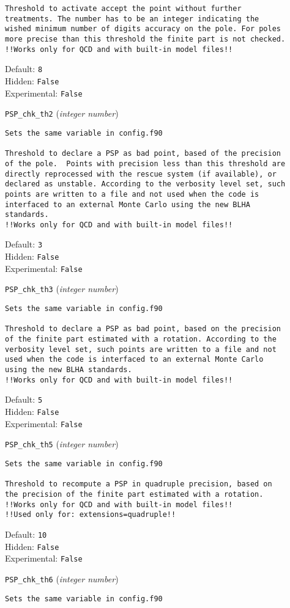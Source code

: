 \begin{basedescript}{\desclabelstyle{\pushlabel}}
\begin{verbatim}
Threshold to activate accept the point without further
treatments. The number has to be an integer indicating the
wished minimum number of digits accuracy on the pole. For poles
more precise than this threshold the finite part is not checked.
!!Works only for QCD and with built-in model files!!
\end{verbatim}
Default: \verb|8|
\\Hidden: \verb|False|
\\Experimental: \verb|False|
\\\item[\colorbox{gray!30}{\texttt{PSP\_chk\_th2}}] (\textit{integer number})
\begin{verbatim}
Sets the same variable in config.f90

Threshold to declare a PSP as bad point, based of the precision
of the pole.  Points with precision less than this threshold are
directly reprocessed with the rescue system (if available), or
declared as unstable. According to the verbosity level set, such
points are written to a file and not used when the code is
interfaced to an external Monte Carlo using the new BLHA
standards.
!!Works only for QCD and with built-in model files!!
\end{verbatim}
Default: \verb|3|
\\Hidden: \verb|False|
\\Experimental: \verb|False|
\\\item[\colorbox{gray!30}{\texttt{PSP\_chk\_th3}}] (\textit{integer number})
\begin{verbatim}
Sets the same variable in config.f90

Threshold to declare a PSP as bad point, based on the precision
of the finite part estimated with a rotation. According to the
verbosity level set, such points are written to a file and not
used when the code is interfaced to an external Monte Carlo
using the new BLHA standards.
!!Works only for QCD and with built-in model files!!
\end{verbatim}
Default: \verb|5|
\\Hidden: \verb|False|
\\Experimental: \verb|False|
\\\item[\colorbox{gray!30}{\texttt{PSP\_chk\_th5}}] (\textit{integer number})
\begin{verbatim}
Sets the same variable in config.f90

Threshold to recompute a PSP in quadruple precision, based on
the precision of the finite part estimated with a rotation.
!!Works only for QCD and with built-in model files!!
!!Used only for: extensions=quadruple!!
\end{verbatim}
Default: \verb|10|
\\Hidden: \verb|False|
\\Experimental: \verb|False|
\\\item[\colorbox{gray!30}{\texttt{PSP\_chk\_th6}}] (\textit{integer number})
\begin{verbatim}
Sets the same variable in config.f90


\end{verbatim}
\end{basedescript}
